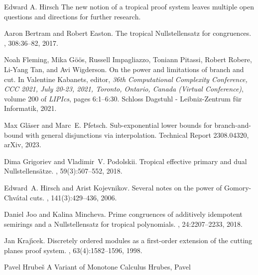 \documentclass[report]{owrart}
\begin{document}
\begin{report}
\begin{talk}{Edward A. Hirsch}
The new notion of a tropical proof system leaves multiple open questions and directions for further research.


  \begin{thebibliography}{99}
  
Aaron Bertram and Robert Easton.
\newblock The tropical {N}ullstellensatz for congruences.
, 308:36--82, 2017.

Noah Fleming, Mika G{\"{o}}{\"{o}}s, Russell Impagliazzo, Toniann Pitassi,
Robert Robere, Li{-}Yang Tan, and Avi Wigderson.
\newblock On the power and limitations of branch and cut.
\newblock In Valentine Kabanets, editor, {\em 36th Computational Complexity
Conference, {CCC} 2021, July 20-23, 2021, Toronto, Ontario, Canada (Virtual
Conference)}, volume 200 of {\em LIPIcs}, pages 6:1--6:30. Schloss Dagstuhl -
Leibniz-Zentrum f{\"{u}}r Informatik, 2021.

Max Gl\"{a}ser and Marc~E. Pfetsch.
\newblock Sub-exponential lower bounds for branch-and-bound with general
disjunctions via interpolation.
\newblock Technical Report 2308.04320, arXiv, 2023.

Dima Grigoriev and Vladimir~V. Podolskii.
\newblock Tropical effective primary and dual {N}ullstellens{\"{a}}tze.
, 59(3):507--552, 2018.

Edward~A. Hirsch and Arist Kojevnikov.
\newblock Several notes on the power of {G}omory-{C}hv{\'{a}}tal cuts.
, 141(3):429--436, 2006.

Daniel Joo and Kalina Mincheva.
\newblock Prime congruences of additively idempotent semirings and a
{N}ullstellensatz for tropical polynomials.
, 24:2207--2233, 2018.

Jan Kraj{\'{\i}}cek.
\newblock Discretely ordered modules as a first-order extension of the cutting
planes proof system.
, 63(4):1582--1596, 1998.

  
  \end{thebibliography}
  
  \end{talk}




\begin{talk}{Pavel Hrube\v{s}}
       {A Variant of Monotone Calculus}
        {Hrubes, Pavel}
        

\end{talk}
\end{report}
\end{document}
